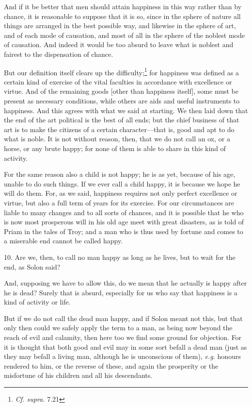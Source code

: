 And if it be better that men should attain happiness in this way
rather than by chance, it is reasonable to suppose that it is so,
since in the sphere of nature all things are arranged in the best
possible way, and likewise in the sphere of art, and of each mode of
causation, and most of all in the sphere of the noblest mode of
causation. And indeed it would be too absurd to leave what is noblest
and fairest to the dispensation of chance.

But our definition itself clears up the
difficulty;\footnote{\textit{Cf. supra.} 7.21}  for happiness
was defined as a certain kind of exercise of the vital faculties in
accordance with excellence or virtue. And of the remaining goods
[other than happiness itself], some must be present as necessary
conditions, while others are aids and useful instruments to happiness.
And this agrees with what we said at starting. We then laid down that
the end of the art political is the best of all ends; but the chief
business of that art is to make the citizens of a certain
character---that is, good and apt to do what is noble. It is not
without reason, then, that we do not call an ox, or a horse, or any
brute happy; for none of them is able to share in this kind of
activity.

For the same reason also a child is not happy; he is as yet, because
of his age, unable to do such things. If we ever call a child happy,
it is because we hope he will do them. For, as we said, happiness
requires not only perfect excellence or virtue, but also a full term
of years for its exercise. For our circumstances are liable to many
changes and to all sorts of chances, and it is possible that he who is
now most prosperous will in his old age meet with great disasters, as
is told of Priam in the tales of Troy; and a man who is thus used by
fortune and comes to a miserable end cannot be called happy.

10. Are we, then, to call no man happy as long as he lives, but to
wait for the end, as Solon said?

And, supposing we have to allow this, do we mean that he actually is
happy after he is dead? Surely that is absurd, especially for us who
say that happiness is a kind of activity or life.

But if we do not call the dead man happy, and if Solon meant
not this, but that only then could we safely apply the term to a man,
as being now beyond the reach of evil and calamity, then here too we
find some ground for objection. For it is thought that both good and
evil may in some sort befall a dead man (just as they may befall a
living man, although he is unconscious of them), \textit{e.g.} honours
rendered to him, or the reverse of these, and again the prosperity or
the misfortune of his children and all his descendants.

